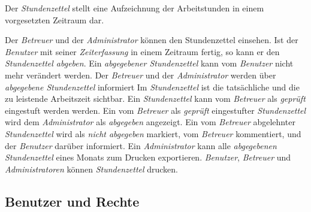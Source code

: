 \begin{requirements}
    Der \emph{Stundenzettel} stellt eine Aufzeichnung der Arbeitstunden in einem vorgesetzten Zeitraum dar.
    \begin{requirements}
         Der \emph{Betreuer} und der \emph{Administrator} können den Stundenzettel einsehen.
         Ist der \emph{Benutzer} mit seiner \emph{Zeiterfassung} in einem Zeitraum fertig, so kann er den \emph{Stundenzettel abgeben}.
         Ein \emph{abgegebener Stundenzettel} kann vom \emph{Benutzer} nicht mehr verändert werden.
         Der \emph{Betreuer} und der \emph{Administrator} werden über \emph{abgegebene Stundenzettel} informiert
         Im \emph{Stundenzettel} ist die tatsächliche und die zu leistende Arbeitszeit sichtbar.
         Ein \emph{Stundenzettel} kann vom \emph{Betreuer} als \emph{geprüft} eingestuft werden werden.
         Ein vom \emph{Betreuer} als \emph{geprüft} eingestufter \emph{Stundenzettel} wird dem \emph{Administrator} als \emph{abgegeben} angezeigt.
         Ein vom \emph{Betreuer} abgelehnter \emph{Stundenzettel} wird als \emph{nicht abgegeben} markiert, vom \emph{Betreuer} kommentiert, und der \emph{Benutzer} darüber informiert.
         Ein \emph{Administrator} kann alle \emph{abgegebenen Stundenzettel} eines Monats zum Drucken exportieren.
        \emph{Benutzer}, \emph{Betreuer} und \emph{Administratoren} können \emph{Stundenzettel} drucken.
    \end{requirements}

\end{requirements}

\subsection{Benutzer und Rechte}

